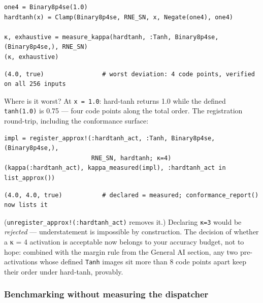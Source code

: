 \nopagebreak[4]
\begin{minipage}{\linewidth}
\begin{verbatim}
one4 = Binary8p4se(1.0)
hardtanh(x) = Clamp(Binary8p4se, RNE_SN, x, Negate(one4), one4)

κ, exhaustive = measure_kappa(hardtanh, :Tanh, Binary8p4se, (Binary8p4se,), RNE_SN)
(κ, exhaustive)
\end{verbatim}




\begin{verbatim}
(4.0, true)                # worst deviation: 4 code points, verified on all 256 inputs
\end{verbatim}
\end{minipage}




Where is it worst? At \texttt{x = 1.0}: hard-tanh returns 1.0 while the defined \texttt{tanh(1.0)} is 0.75 — four code points along the total order. The registration round-trip, including the conformance surface:




\nopagebreak[4]
\begin{minipage}{\linewidth}
\begin{verbatim}
impl = register_approx!(:hardtanh_act, :Tanh, Binary8p4se, (Binary8p4se,),
                        RNE_SN, hardtanh; κ=4)
(kappa(:hardtanh_act), kappa_measured(impl), :hardtanh_act in list_approx())
\end{verbatim}




\begin{verbatim}
(4.0, 4.0, true)           # declared = measured; conformance_report() now lists it
\end{verbatim}
\end{minipage}




(\texttt{unregister\_\allowbreak{}approx!(\allowbreak{}:hardtanh\_\allowbreak{}act)} removes it.) Declaring \texttt{κ=3} would be \emph{rejected} — understatement is impossible by construction. The decision of whether a κ = 4 activation is acceptable now belongs to your accuracy budget, not to hope: combined with the margin rule from the General AI section, any two pre-activations whose defined \texttt{Tanh} images sit more than 8 code points apart keep their order under hard-tanh, provably.



\subsubsection{Benchmarking without measuring the dispatcher}



